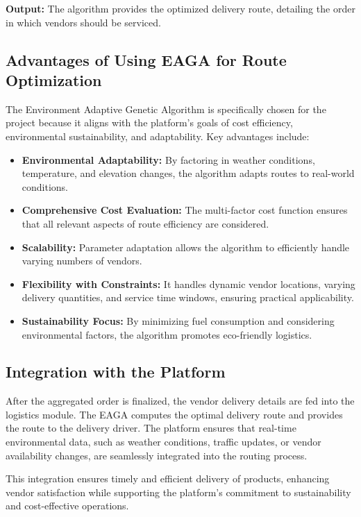 \textbf{Output:}
The algorithm provides the optimized delivery route, detailing the order in which vendors should be serviced.

\subsection{Advantages of Using EAGA for Route Optimization}

The Environment Adaptive Genetic Algorithm is specifically chosen for the project because it aligns with the platform's goals of cost efficiency, environmental sustainability, and adaptability. Key advantages include:

\begin{itemize}
    \item \textbf{Environmental Adaptability:} By factoring in weather conditions, temperature, and elevation changes, the algorithm adapts routes to real-world conditions.
    \item \textbf{Comprehensive Cost Evaluation:} The multi-factor cost function ensures that all relevant aspects of route efficiency are considered.
    \item \textbf{Scalability:} Parameter adaptation allows the algorithm to efficiently handle varying numbers of vendors.
    \item \textbf{Flexibility with Constraints:} It handles dynamic vendor locations, varying delivery quantities, and service time windows, ensuring practical applicability.
    \item \textbf{Sustainability Focus:} By minimizing fuel consumption and considering environmental factors, the algorithm promotes eco-friendly logistics.
\end{itemize}

\subsection{Integration with the Platform}

After the aggregated order is finalized, the vendor delivery details are fed into the logistics module. The EAGA computes the optimal delivery route and provides the route to the delivery driver. The platform ensures that real-time environmental data, such as weather conditions, traffic updates, or vendor availability changes, are seamlessly integrated into the routing process.

This integration ensures timely and efficient delivery of products, enhancing vendor satisfaction while supporting the platform's commitment to sustainability and cost-effective operations.

